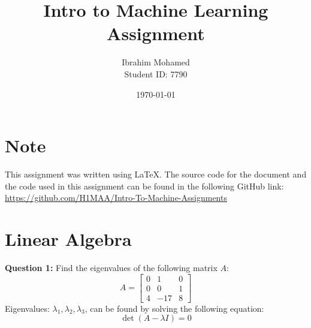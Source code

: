 \documentclass[a4paper,12pt]{article}
\title{Intro to Machine Learning Assignment}
\author{Ibrahim Mohamed \\ Student ID: 7790 \\}
\date{\today}
\begin{document}
\maketitle
\section*{Note}
This assignment was written using LaTeX. The source code for the document and the code used in this assignment can be found in the following GitHub link:
\url{https://github.com/H1MAA/Intro-To-Machine-Assignments}

\thispagestyle{empty}
\newpage

\section{Linear Algebra}
\textbf{Question 1:}
Find the eigenvalues of the following matrix \( A \):
\[
A = \begin{bmatrix}
0 & 1 & 0 \\
0 & 0 & 1 \\
4 & -17 & 8
\end{bmatrix}
\]
Eigenvalues: \(\lambda_1, \lambda_2, \lambda_3\), can be found by solving the following equation:
\[
\det(A - \lambda I) = 0
\]
\end{document}
